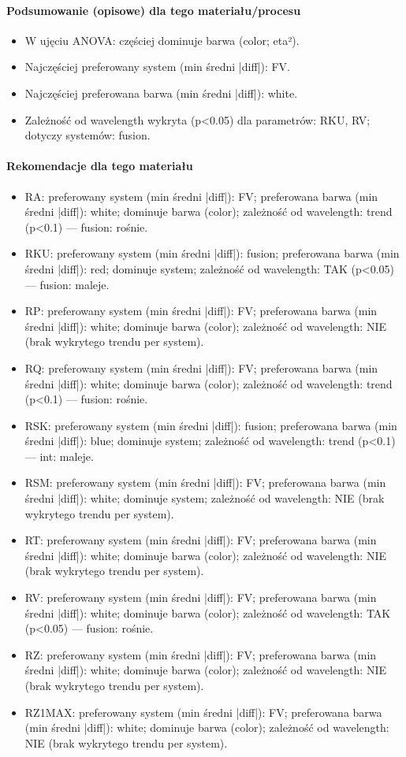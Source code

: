 \documentclass[
  10pt,
]{article}
\begin{document}
\paragraph{Podsumowanie (opisowe) dla tego materiału/procesu}
\begin{itemize}
\item W ujęciu ANOVA: częściej dominuje barwa (color; eta²).
\item Najczęściej preferowany system (min średni |diff|): FV.
\item Najczęściej preferowana barwa (min średni |diff|): white.
\item Zależność od wavelength wykryta (p<0.05) dla parametrów: RKU, RV; dotyczy systemów: fusion.
\end{itemize}
\paragraph{Rekomendacje dla tego materiału}
\begin{itemize}
\item RA: preferowany system (min średni |diff|): FV; preferowana barwa (min średni |diff|): white; dominuje barwa (color); zależność od wavelength: trend (p<0.1) — fusion: rośnie.
\item RKU: preferowany system (min średni |diff|): fusion; preferowana barwa (min średni |diff|): red; dominuje system; zależność od wavelength: TAK (p<0.05) — fusion: maleje.
\item RP: preferowany system (min średni |diff|): FV; preferowana barwa (min średni |diff|): white; dominuje barwa (color); zależność od wavelength: NIE (brak wykrytego trendu per system).
\item RQ: preferowany system (min średni |diff|): FV; preferowana barwa (min średni |diff|): white; dominuje barwa (color); zależność od wavelength: trend (p<0.1) — fusion: rośnie.
\item RSK: preferowany system (min średni |diff|): fusion; preferowana barwa (min średni |diff|): blue; dominuje system; zależność od wavelength: trend (p<0.1) — int: maleje.
\item RSM: preferowany system (min średni |diff|): FV; preferowana barwa (min średni |diff|): white; dominuje system; zależność od wavelength: NIE (brak wykrytego trendu per system).
\item RT: preferowany system (min średni |diff|): FV; preferowana barwa (min średni |diff|): white; dominuje barwa (color); zależność od wavelength: NIE (brak wykrytego trendu per system).
\item RV: preferowany system (min średni |diff|): FV; preferowana barwa (min średni |diff|): white; dominuje barwa (color); zależność od wavelength: TAK (p<0.05) — fusion: rośnie.
\item RZ: preferowany system (min średni |diff|): FV; preferowana barwa (min średni |diff|): white; dominuje barwa (color); zależność od wavelength: NIE (brak wykrytego trendu per system).
\item RZ1MAX: preferowany system (min średni |diff|): FV; preferowana barwa (min średni |diff|): white; dominuje barwa (color); zależność od wavelength: NIE (brak wykrytego trendu per system).
\end{itemize}
\end{document}
